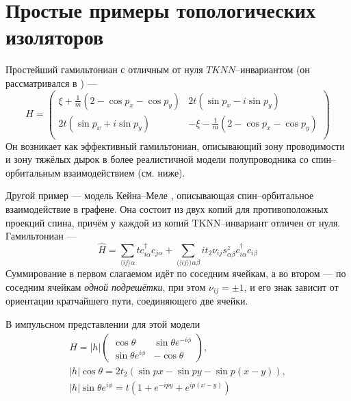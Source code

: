 \section{Простые примеры топологических изоляторов}
Простейший гамильтониан с отличным от нуля $TKNN$--инвариантом 
(он рассматривался в \cite{Qi2006}) ---
\begin{equation}
    H = \left(\begin{matrix}
            \xi + \frac{1}{m}(2 - \cos{p_x} - \cos{p_y}) & 2t(\sin{p_x} - i\sin{p_y})   \\
            2t(\sin{p_x} + i\sin{p_y}) & - \xi - \frac{1}{m}(2 - \cos{p_x} - \cos{p_y}) \\
        \end{matrix}\right)
\end{equation}
Он возникает как эффективный гамильтониан, описывающий зону проводимости и зону
тяжёлых дырок в более реалистичной модели полупроводника со спин--орбитальным
взаимодействием (см. ниже).

Другой пример --- модель Кейна--Меле \cite{Kane2005}, 
описывающая спин--орбитальное взаимодействие в 
графене. Она состоит из двух копий для противоположных проекций спина, причём у каждой
из копий $\mathrm{TKNN}$--инвариант отличен от нуля. Гамильтониан --- 
\begin{equation}
		\hat{H} = 
			\sum_{\langle ij \rangle \alpha} t c^\dagger_{i\alpha} c_{j\alpha} + 
				\sum_{\langle\langle ij \rangle\rangle \alpha\beta} 
					it_2 \nu_{ij} s^z_{\alpha \beta} c^\dagger_{i\alpha} c_{i\beta}
\end{equation}
Суммирование в первом слагаемом идёт по соседним ячейкам, а во втором --- по соседним
ячейкам \emph{одной подрешётки}, при этом $\nu_{ij} = \pm 1$, и его знак зависит
от ориентации кратчайшего пути, соединяющего две ячейки.

В импульсном представлении для этой модели
\begin{equation}
    \begin{gathered}
    	H = |h|\left(
            \begin{matrix}
                \cos{\theta} & \sin{\theta}e^{-i\phi} \\
                \sin{\theta}e^{i\phi} & -\cos{\theta}
            \end{matrix}
    	\right),\\
    	|h|\cos{\theta} = 2t_2 (\sin{px} - \sin{py} - \sin{p(x-y)}), \\
    	|h|\sin{\theta}e^{i\phi} = t(1 + e^{-ipy} + e^{ip(x-y)}) 
    \end{gathered}
\end{equation}

